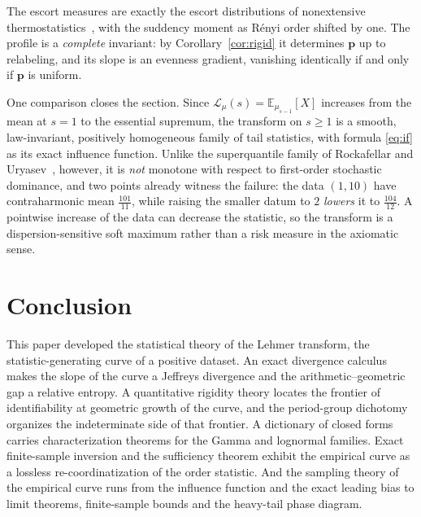 \documentclass[sn-mathphys-num]{sn-jnl}
\theoremstyle{thmstyleone}%
\theoremstyle{thmstyletwo}%
\theoremstyle{thmstylethree}%
\theoremstyle{thmstyleone}%
\providecommand{\E}{\mathbb{E}}
\providecommand{\Leh}{\mathscr{L}}
\providecommand{\pp}{\boldsymbol p}
\begin{document}
	
	The escort measures are exactly the escort distributions of
	nonextensive thermostatistics~\cite{tsallis2009}, with the
	suddency moment as R\'enyi order shifted by one. The profile is a
	\emph{complete} invariant: by Corollary~\ref{cor:rigid} it
	determines $\pp$ up to relabeling, and its slope is an evenness
	gradient, vanishing identically if and only if $\pp$ is uniform.
	
	One comparison closes the section. Since
	$\Leh_\mu(s)=\E_{\mu_{s-1}}[X]$ increases from the mean at $s=1$
	to the essential supremum, the transform on $s\ge1$ is a smooth,
	law-invariant, positively homogeneous family of tail statistics,
	with formula \eqref{eq:if} as its exact influence function. Unlike
	the superquantile family of Rockafellar and
	Uryasev~\cite{rockafellar2002}, however, it is \emph{not} monotone
	with respect to first-order stochastic dominance, and two points
	already witness the failure: the data $(1,10)$ have contraharmonic
	mean $\tfrac{101}{11}$, while raising the smaller datum to $2$
	\emph{lowers} it to $\tfrac{104}{12}$. A pointwise increase of the
	data can decrease the statistic, so the transform is a
	dispersion-sensitive soft maximum rather than a risk measure in the
	axiomatic sense.
	
	\section{Conclusion}\label{sec:conclusion}
	
	This paper developed the statistical theory of the Lehmer transform,
	the statistic-generating curve of a positive dataset. An exact
	divergence calculus makes the slope of the curve a Jeffreys divergence
	and the arithmetic--geometric gap a relative entropy. A quantitative
	rigidity theory locates the frontier of identifiability at geometric
	growth of the curve, and the period-group dichotomy organizes the
	indeterminate side of that frontier. A dictionary of closed forms
	carries characterization theorems for the Gamma and lognormal
	families. Exact finite-sample inversion and the sufficiency theorem
	exhibit the empirical curve as a lossless re-coordinatization of the
	order statistic. And the sampling theory of the empirical curve runs
	from the influence function and the exact leading bias to limit
	theorems, finite-sample bounds and the heavy-tail phase diagram.
	
\end{document}
